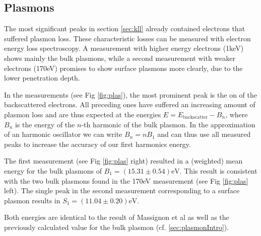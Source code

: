 \documentclass[a4paper]{scrartcl}
\numberwithin{equation}{section}
\numberwithin{figure}{section}
\numberwithin{table}{section}
\begin{document}
\FloatBarrier




\subsection{Plasmons}
\label{sec:plas}
The most significant peaks in section \ref{sec:kll} already contained electrons that suffered plasmon loss. These characteristic losses can be measured with electron energy loss spectroscopy. A measurement with higher energy electrons (1keV) shows mainly the bulk plasmons, while a second measurement with weaker electrons (170eV) promises to show surface plasmons more clearly, due to the lower penetration depth.

In the measurements (see Fig \ref{fig:plas}), the most prominent peak is the on of the backscattered electrons. All preceding ones have suffered an increasing amount of plasmon loss and are thus expected at the energies $E=E_\text{backscatter}-B_n$, where $B_n$ is the energy of the $n$-th harmonic of the bulk plasmon. In the approximation of an harmonic oscillator we can write $B_n = n B_1$ and can thus use all measured peaks to increase the accuracy of our first harmonics energy.

The first measurement (see Fig \ref{fig:plas} right) resulted in a (weighted) mean energy for the bulk plasmons of $B_1 = (15.31\pm 0.54)\text{eV}$. This result is consistent with the two bulk plasmons found in the 170eV measurement (see Fig \ref{fig:plas} left). The single peak in the second measurement corresponding to a surface plasmon results in $S_1 = (11.04\pm 0.20)\text{eV}$. 

Both energies are identical to the result of Massignon et al \cite{paperplasmon}  as well as the previously calculated value for the bulk plasmon (cf. \ref{sec:plasmonIntro}).
\end{document}
